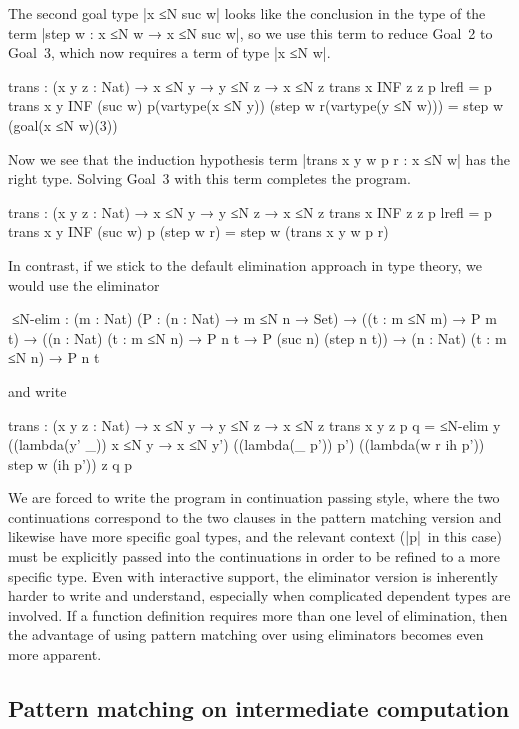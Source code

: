 The second goal type |x ≤N suc w| looks like the conclusion in the type of the term |step w : x ≤N w → x ≤N suc w|, so we use this term to reduce Goal~2 to Goal~3, which now requires a term of type |x ≤N w|.
\begin{code}
trans : (x y z : Nat) → x ≤N y → y ≤N z → x ≤N z
trans x  INF  z       z        p                   lrefl                        = p
trans x       y  INF  (suc w)  p(vartype(x ≤N y))  (step w r(vartype(y ≤N w)))  = step w (goal(x ≤N w)(3))
\end{code}
Now we see that the induction hypothesis term |trans x y w p r : x ≤N w| has the right type.
Solving Goal~3 with this term completes the program.
\begin{code}
trans : (x y z : Nat) → x ≤N y → y ≤N z → x ≤N z
trans x  INF  z       z        p lrefl       = p
trans x       y  INF  (suc w)  p (step w r)  = step w (trans x y w p r)
\end{code}
In contrast, if we stick to the default elimination approach in type theory, we would use the eliminator
\begin{code}
^^^≤N-elim :  (m : Nat) (P : (n : Nat) → m ≤N n → Set) →
              ((t : m ≤N m) → P m t) →
              ((n : Nat) (t : m ≤N n) → P n t → P (suc n) (step n t)) →
              (n : Nat) (t : m ≤N n) → P n t
\end{code}
and write
\begin{code}
trans : (x y z : Nat) → x ≤N y → y ≤N z → x ≤N z
trans x y z p q = ≤N-elim y  ((lambda(y' _)) x ≤N y → x ≤N y')
                             ((lambda(_ p')) p') ((lambda(w r ih p')) step w (ih p')) z q p
\end{code}
We are forced to write the program in continuation passing style, where the two continuations correspond to the two clauses in the pattern matching version and likewise have more specific goal types, and the relevant context (|p|~in this case) must be explicitly passed into the continuations in order to be refined to a more specific type.
Even with interactive support, the eliminator version is inherently harder to write and understand, especially when complicated dependent types are involved.
If a function definition requires more than one level of elimination, then the advantage of using pattern matching over using eliminators becomes even more apparent.

\subsection{Pattern matching on intermediate computation}
\label{sec:with}

